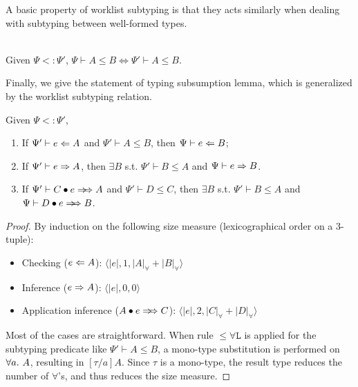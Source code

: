 A basic property of worklist subtyping is that they acts similarly when
dealing with subtyping between well-formed types.
\begin{lemma}~\\
    Given $\Psi <: \Psi'$, $\Psi \vdash A \le B \Longleftrightarrow \Psi' \vdash A \le B$.
\end{lemma}

Finally, we give the statement of typing subsumption lemma,
which is generalized by the worklist subtyping relation.

\begin{lemma}
    Given $\Psi <: \Psi'$,
    \begin{enumerate}[1)]
        \item If $\Psi' \vdash e \Leftarrow A$ and $\Psi' \vdash A \le B$, then $\Psi \vdash e \Leftarrow B$;
        \item If $\Psi' \vdash e \Rightarrow A$, then $\exists B$ s.t. $\Psi' \vdash B \le A$ and $\Psi \vdash e \Rightarrow B$.
        \item If $\Psi' \vdash \appInf{C}{e}{A}$ and $\Psi' \vdash D \le C$, then
            $\exists B$ s.t. $\Psi' \vdash B \le A$ and $\Psi \vdash \appInf{D}{e}{B}$.
    \end{enumerate}
\end{lemma}

\begin{proof}
    By induction on the following size measure (lexicographical order on a 3-tuple):
    \begin{itemize}
        \item Checking ($e \Leftarrow A$): $\langle |e|, 1, |A|_\forall + |B|_\forall \rangle$
        \item Inference ($e \Rightarrow A$): $\langle |e|, 0, 0 \rangle$
        \item Application inference ($\appInf{A}{e}{C}$): $\langle |e|, 2, |C|_\forall + |D|_\forall \rangle$
    \end{itemize}
    Most of the cases are straightforward.
    When rule $\mathtt{{\le}\forall L}$ is applied for the subtyping predicate
    like $\Psi' \vdash A \le B$,
    a mono-type substitution is performed on $\all A$,
    resulting in $[\tau/a]A$.
    Since $\tau$ is a mono-type, the result type reduces the number of $\forall$'s,
    and thus reduces the size measure.
\end{proof}

